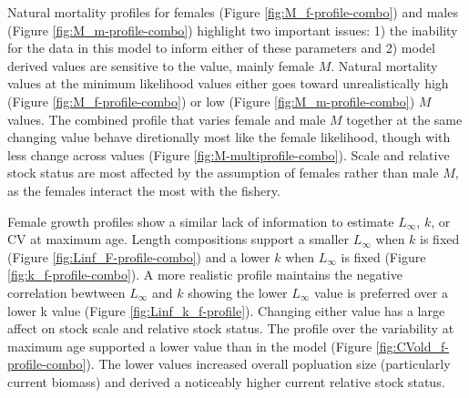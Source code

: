 \documentclass[11pt,
  english,
  a4paper,
]{article}
\begin{document}
Natural mortality profiles for females (Figure \ref{fig:M_f-profile-combo}) and males (Figure \ref{fig:M_m-profile-combo}) highlight two important issues: 1) the inability for the data in this model to inform either of these parameters and 2) model derived values are sensitive to the value, mainly female {\(M\)\leavevmode\tagmcend\tagstructend}. Natural mortality values at the minimum likelihood values either goes toward unrealistically high (Figure \ref{fig:M_f-profile-combo}) or low (Figure \ref{fig:M_m-profile-combo}) {\(M\)\leavevmode\tagmcend\tagstructend} values. The combined profile that varies female and male {\(M\)\leavevmode\tagmcend\tagstructend} together at the same changing value behave diretionally most like the female likelihood, though with less change across values (Figure \ref{fig:M-multiprofile-combo}). Scale and relative stock status are most affected by the assumption of females rather than male {\(M\)\leavevmode\tagmcend\tagstructend}, as the females interact the most with the fishery.

\leavevmode\tagmcend\tagstructend\par


Female growth profiles show a similar lack of information to estimate {\(L_{\infty}\)\leavevmode\tagmcend\tagstructend}, {\(k\)\leavevmode\tagmcend\tagstructend}, or CV at maximum age. Length compositions support a smaller {\(L_{\infty}\)\leavevmode\tagmcend\tagstructend} when {\(k\)\leavevmode\tagmcend\tagstructend} is fixed (Figure \ref{fig:Linf_F-profile-combo}) and a lower {\(k\)\leavevmode\tagmcend\tagstructend} when {\(L_{\infty}\)\leavevmode\tagmcend\tagstructend} is fixed (Figure \ref{fig:k_f-profile-combo}). A more realistic profile maintains the negative correlation bewtween {\(L_{\infty}\)\leavevmode\tagmcend\tagstructend} and {\(k\)\leavevmode\tagmcend\tagstructend} showing the lower {\(L_{\infty}\)\leavevmode\tagmcend\tagstructend} value is preferred over a lower k value (Figure \ref{fig:Linf_k_f-profile}). Changing either value has a large affect on stock scale and relative stock status. The profile over the variability at maximum age supported a lower value than in the model (Figure \ref{fig:CVold_f-profile-combo}). The lower values increased overall popluation size (particularly current biomass) and derived a noticeably higher current relative stock status.
\end{document}
